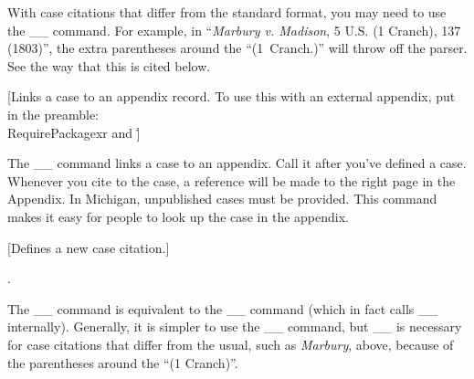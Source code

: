  With case citations that differ from the standard format, you may need to use the _\newcase_ command.
 For example, in ``\emph{Marbury v. Madison}, 5 U.S. (1 Cranch), 137 (1803)'', the extra parentheses around
 the ``(1~Cranch.)'' will throw off the parser. See the way that this is cited below. 

 [Links a case to an appendix record. To use this with an external appendix, put in the preamble: \\RequirePackage{xr} and \.]
 \begin{Example}
 \end{Example}
 \noindent The _\caseReference_ command links a case to an appendix. Call it after you've defined a case. Whenever you cite to the case, a reference will be made to the right page in the Appendix. In Michigan, unpublished cases must be provided. This command makes it easy for people to look up the case in the appendix.

 
[Defines a new case citation.]
 \begin{Example}
   .
 \end{Example}

 \noindent The _\newcase_ command is equivalent to the _\citecase_ command (which in fact calls _\newcase_ internally). 
 Generally, it is simpler to use the _\citecase_ command, but _\newcase_ is necessary for case citations that differ from the usual, 
 such as \textit{Marbury}, above, because of the parentheses around the ``(1 Cranch)''. 



